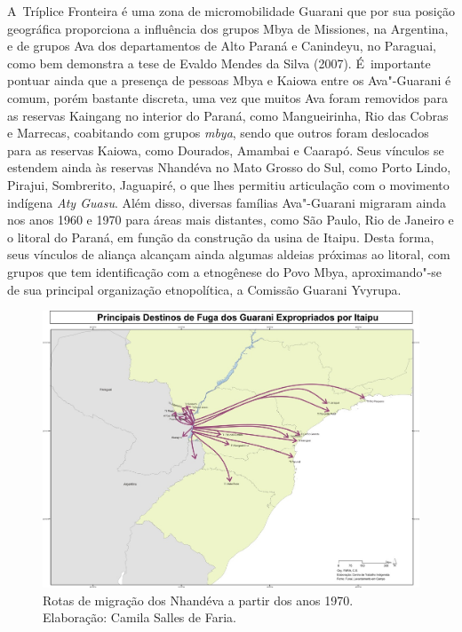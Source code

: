 A~Tríplice Fronteira é uma zona de micromobilidade Guarani que por sua
posição geográfica proporciona a influência dos grupos Mbya de
Missiones, na Argentina, e de grupos Ava dos departamentos de Alto
Paraná e Canindeyu, no Paraguai, como bem demonstra a tese de Evaldo
Mendes da Silva (2007). É~importante pontuar ainda que a presença de
pessoas Mbya e Kaiowa entre os Ava"-Guarani é comum, porém bastante
discreta, uma vez que muitos Ava foram removidos para as reservas
Kaingang no interior do Paraná, como Mangueirinha, Rio das Cobras e
Marrecas, coabitando com grupos \emph{mbya}, sendo que outros foram deslocados
para as reservas Kaiowa, como Dourados, Amambai e Caarapó. Seus
vínculos se estendem ainda às reservas Nhandéva no Mato Grosso do Sul,
como Porto Lindo, Pirajui, Sombrerito, Jaguapiré, o que lhes permitiu
articulação com o movimento indígena \emph{Aty Guasu}. Além disso, diversas
famílias Ava"-Guarani migraram ainda nos anos 1960 e 1970 para áreas
mais distantes, como São Paulo, Rio de Janeiro e o litoral do Paraná,
em função da construção da usina de Itaipu. Desta forma, seus vínculos
de aliança alcançam ainda algumas aldeias próximas ao litoral, com
grupos que tem identificação com a etnogênese do Povo Mbya,
aproximando"-se de sua principal organização etnopolítica, a Comissão
Guarani Yvyrupa.

 \begin{figure}
  \centering
 \includegraphics[width=\textwidth]{./img/GUARANIS-img8.jpg}	
  \hfill
  \caption{Rotas de migração dos Nhandéva a
partir dos anos 1970. Elaboração: Camila Salles de Faria.}
\end{figure}

